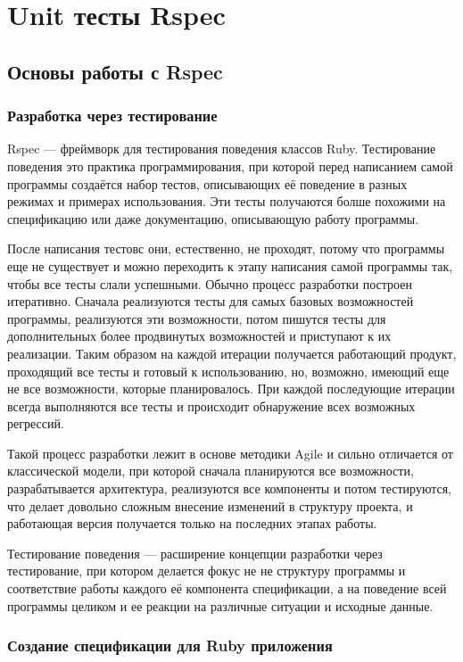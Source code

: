 \chapter{Unit тесты Rspec}

\section{Основы работы с Rspec}

\subsection{Разработка через тестирование}

Rspec --- фреймворк для тестирования поведения классов Ruby. Тестирование поведения это практика программирования, при которой перед написанием самой программы создаётся набор тестов, описывающих её поведение в разных режимах и примерах использования. Эти тесты получаются болше похожими на спецификацию или даже документацию, описывающую работу программы.

После написания тестовс они, естественно, не проходят, потому что программы еще не существует и можно переходить к этапу написания самой программы так, чтобы все тесты слали успешными. Обычно процесс разработки построен итеративно. Сначала реализуются тесты для самых базовых возможностей программы, реализуются эти возможности, потом пишутся тесты для дополнительных более продвинутых возможностей и приступают к их реализации. Таким образом на каждой итерации получается работающий продукт, проходящий все тесты и готовый к использованию, но, возможно, имеющий еще не все возможности, которые планировалось. При каждой последующие итерации всегда выполняются все тесты и происходит обнаружение всех возможных регрессий.

Такой процесс разработки лежит в основе методики Agile и сильно отличается от классической модели, при которой сначала планируются все возможности, разрабатывается архитектура, реализуются все компоненты и потом тестируются, что делает довольно сложным внесение изменений в структуру проекта, и работающая версия получается только на последних этапах работы.

Тестирование поведения --- расширение концепции разработки через тестирование, при котором делается фокус не не структуру программы и соответствие работы каждого её компонента спецификации, а на поведение всей программы целиком и ее реакции на различные ситуации и исходные данные.

\subsection{Создание спецификации для Ruby приложения}

